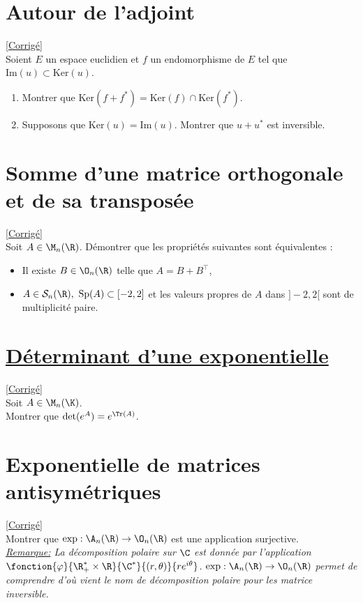 \documentclass[8pt]{book}
\begin{document}
\section{Autour de l'adjoint }
\label{Autour de l'adjoint}
\textcolor{blue}{\hyperref[Autour de l'adjoint corrigé]{[Corrigé]}}\\
Soient $E$ un espace euclidien et $f$ un endomorphisme de $E$ tel que $\text{Im}(u)\subset \text{Ker}(u)$.
\begin{enumerate}
	\item Montrer que $\text{Ker}(f+f^*)=\text{Ker}(f)\cap\text{Ker}(f^*)$.
	\item Supposons que $\text{Ker}(u)=\text{Im}(u)$. Montrer que $u+u^*$ est inversible.
\end{enumerate}

\section{Somme d'une matrice orthogonale et de sa transposée }
\label{Somme d'une matrice orthogonale et de sa transposée}
\textcolor{blue}{\hyperref[Somme d'une matrice orthogonale et de sa transposée corrigé]{[Corrigé]}}\\
Soit $A\in\M_n(\R)$. Démontrer que les propriétés suivantes sont équivalentes :
\begin{itemize}
	\item Il existe $B\in\O_n(\R)$ telle que $A=B+B^\top$,
	\item $A\in\mathcal{S}_n(\R),\ \operatorname{Sp}(A)\subset[-2,2]$ et les valeurs propres de $A$ dans $]-2,2[$ sont de multiplicité paire.
\end{itemize}

\section{\underline{Déterminant d'une exponentielle} }
\label{Déterminant d'une exponentielle}
\textcolor{blue}{\hyperref[Déterminant d'une exponentielle corrigé]{[Corrigé]}}\\
Soit $A\in\M_n(\K)$.
\\ Montrer que $\det(e^A)=e^{\Tr(A)}$.

\section{Exponentielle de matrices antisymétriques }
\label{Exponentielle de matrices antisymétriques}
\textcolor{blue}{\hyperref[Exponentielle de matrices antisymétriques corrigé]{[Corrigé]}}\\
Montrer que $\exp:\A_n(\R)\to \O_n(\R)$ est une application surjective. 
\\
\textit{\underline{Remarque:} La décomposition polaire sur $\C$ est donnée par l'application $\fonction{\varphi}{\R^*_+\times\R}{\C^*}{(r,\theta)}{re^{i\theta}}$. $\exp:\A_n(\R)\to \O_n(\R)$ permet de comprendre d'où vient le nom de décomposition polaire pour les matrice inversible.}
\end{document}
